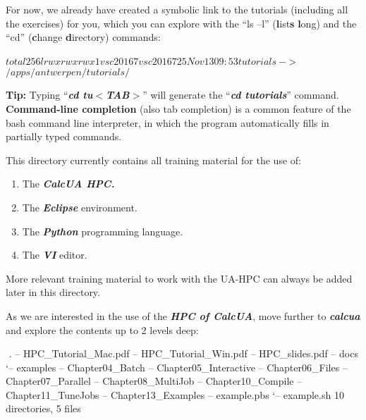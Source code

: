 For now, we already have created a symbolic link to the tutorials (including
all the exercises) for you, which you can explore with the ``ls --l''
(\textbf{l}ist\textbf{s} \textbf{l}ong) and the ``cd'' (\textbf{c}hange
\textbf{d}irectory) commands:

\begin{prompt}
$ %
total 256
lrwxrwxrwx 1 vsc20167 vsc20167 25 Nov 13 09:53 tutorials -$>$ /apps/antwerpen/tutorials/
$ %
\end{prompt}

\textbf{Tip: }Typing ``\textbf{\textit{cd tu$<$TAB$>$}}'' will generate the
``\textbf{\textit{cd tutorials}}'' command. \textbf{Command-line completion
}(also tab completion) is a common feature of the bash command line
interpreter, in which the program automatically fills in partially typed
commands.


This directory currently contains all training material for the use of:

\begin{enumerate}
\item  The \textbf{\textit{CalcUA HPC.}}
\item  The \textbf{\textit{Eclipse}} environment.
\item  The \textbf{\textit{Python}} programming language.
\item  The \textbf{\textit{VI}} editor.
\end{enumerate}

More relevant training material to work with the UA-HPC can always be added
later in this directory.

As we are interested in the use of the \textbf{\textit{HPC of CalcUA}}, move
further to \textbf{\textit{calcua}} and explore the contents up to 2 levels
deep:

\begin{prompt}
$ %
$ %
.
\textbar -- HPC\_Tutorial\_Mac.pdf
\textbar -- HPC\_Tutorial\_Win.pdf
\textbar -- HPC\_slides.pdf
\textbar -- docs
`-- examples
    \textbar -- Chapter04\_Batch
    \textbar -- Chapter05\_Interactive
    \textbar -- Chapter06\_Files
    \textbar -- Chapter07\_Parallel
    \textbar -- Chapter08\_MultiJob
    \textbar -- Chapter10\_Compile
    \textbar -- Chapter11\_TuneJobs
    \textbar -- Chapter13\_Examples
    \textbar -- example.pbs
    `-- example.sh
10 directories, 5 files
\end{prompt}

